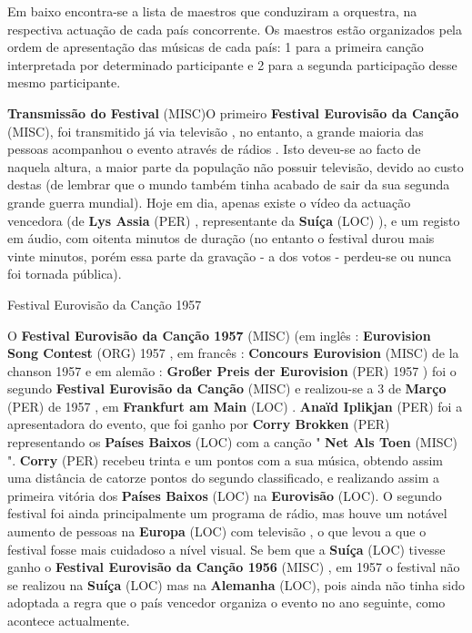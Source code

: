\documentclass[12pt,a4paper]{article}
\begin{document}
Em baixo encontra-se a lista de maestros que conduziram a orquestra, na respectiva actuação de cada país concorrente. Os maestros estão organizados pela ordem de apresentação das músicas de cada país: 1 para a primeira canção interpretada por determinado participante e 2 para a segunda participação desse mesmo participante.



\textbf{Transmissão do Festival} (MISC)O primeiro \textbf{Festival Eurovisão da Canção} (MISC), foi transmitido já via televisão , no entanto, a grande maioria das pessoas acompanhou o evento através de rádios . Isto deveu-se ao facto de naquela altura, a maior parte da população não possuir televisão, devido ao custo destas (de lembrar que o mundo também tinha acabado de sair da sua segunda grande guerra mundial). Hoje em dia, apenas existe o vídeo da actuação vencedora (de \textbf{Lys Assia} (PER) , representante da \textbf{Suíça} (LOC) ), e um registo em áudio, com oitenta minutos de duração (no entanto o festival durou mais vinte minutos, porém essa parte da gravação - a dos votos - perdeu-se ou nunca foi tornada pública).



Festival Eurovisão da Canção 1957



O \textbf{Festival Eurovisão da Canção 1957} (MISC) (em inglês : \textbf{Eurovision Song Contest} (ORG) 1957 , em francês : \textbf{Concours Eurovision} (MISC) de la chanson 1957 e em alemão : \textbf{Großer Preis der Eurovision} (PER) 1957 ) foi o segundo \textbf{Festival Eurovisão da Canção} (MISC) e realizou-se a 3 de \textbf{Março} (PER) de 1957 , em \textbf{Frankfurt am Main} (LOC) . \textbf{Anaïd Iplikjan} (PER) foi a apresentadora do evento, que foi ganho por \textbf{Corry Brokken} (PER) representando os \textbf{Países Baixos} (LOC) com a canção " \textbf{Net Als Toen} (MISC) ". \textbf{Corry} (PER) recebeu trinta e um pontos com a sua música, obtendo assim uma distância de catorze pontos do segundo classificado, e realizando assim a primeira vitória dos \textbf{Países Baixos} (LOC) na \textbf{Eurovisão} (LOC). O segundo festival foi ainda principalmente um programa de rádio, mas houve um notável aumento de pessoas na \textbf{Europa} (LOC) com televisão , o que levou a que o festival fosse mais cuidadoso a nível visual. Se bem que a \textbf{Suíça} (LOC) tivesse ganho o \textbf{Festival Eurovisão da Canção 1956} (MISC) , em 1957 o festival não se realizou na \textbf{Suíça} (LOC) mas na \textbf{Alemanha} (LOC), pois ainda não tinha sido adoptada a regra que o país vencedor organiza o evento no ano seguinte, como acontece actualmente.
\end{document}
